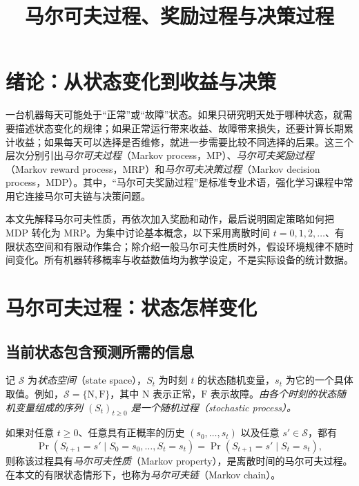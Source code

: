 \documentclass[UTF8,12pt,a4paper,fontset=fandol]{ctexart}
\title{马尔可夫过程、奖励过程与决策过程}
\author{}
\date{}
\begin{document}
\maketitle

\section{绪论：从状态变化到收益与决策}
\label{sec:markov-three-intro}

一台机器每天可能处于“正常”或“故障”状态。如果只研究明天处于哪种状态，就需要描述状态变化的规律；如果正常运行带来收益、故障带来损失，还要计算长期累计收益；如果每天可以选择是否维修，就进一步需要比较不同选择的后果。这三个层次分别引出\emph{马尔可夫过程}（Markov process，MP）、\emph{马尔可夫奖励过程}（Markov reward process，MRP）和\emph{马尔可夫决策过程}（Markov decision process，MDP）。其中，“马尔可夫奖励过程”是标准专业术语，强化学习课程中常用它连接马尔可夫链与决策问题。

本文先解释马尔可夫性质，再依次加入奖励和动作，最后说明固定策略如何把 MDP 转化为 MRP。为集中讨论基本概念，以下采用离散时间 $t=0,1,2,\ldots$、有限状态空间和有限动作集合；除介绍一般马尔可夫性质时外，假设环境规律不随时间变化。所有机器转移概率与收益数值均为教学设定，不是实际设备的统计数据。

\section{马尔可夫过程：状态怎样变化}
\label{sec:markov-three-mp}

\subsection{当前状态包含预测所需的信息}

记 $\mathcal S$ 为\emph{状态空间}（state space），$S_t$ 为时刻 $t$ 的状态随机变量，$s_t$ 为它的一个具体取值。例如，$\mathcal S=\{\mathrm N,\mathrm F\}$，其中 $\mathrm N$ 表示正常，$\mathrm F$ 表示故障。\emph{由各个时刻的状态随机变量组成的序列 $(S_t)_{t\geq0}$ 是一个\emph{随机过程}（stochastic process）。}

\begin{definition}[离散时间的马尔可夫性质]
如果对任意 $t\geq0$、任意具有正概率的历史 $(s_0,\ldots,s_t)$ 以及任意 $s'\in\mathcal S$，都有
\begin{equation}
  \Pr(S_{t+1}=s'\mid S_0=s_0,\ldots,S_t=s_t)
  =\Pr(S_{t+1}=s'\mid S_t=s_t),
  \label{eq:markov-three-property}
\end{equation}
则称该过程具有\emph{马尔可夫性质}（Markov property），是离散时间的马尔可夫过程。在本文的有限状态情形下，也称为\emph{马尔可夫链}（Markov chain）。
\end{definition}
\end{document}
